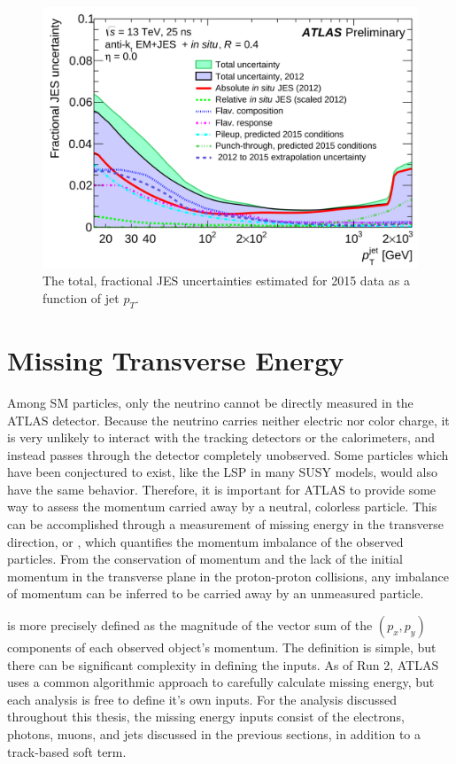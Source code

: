 \begin{figure}
\includegraphics[width=\fullfig]{figures/reco_jes_pt.png}
\caption{The total, fractional \ac{JES} uncertainties estimated for 2015 data as a function of jet $p_T$.}
\label{fig:reco_jesunc}
\end{figure}


\section{Missing Transverse Energy}
\label{sec:missing_energy}

Among \ac{SM} particles, only the neutrino cannot be directly measured in the \ac{ATLAS} detector. 
Because the neutrino carries neither electric nor color charge, it is very unlikely to interact with the tracking detectors or the calorimeters, and instead passes through the detector completely unobserved.
Some particles which have been conjectured to exist, like the \ac{LSP} in many \ac{SUSY} models, would also have the same behavior.
Therefore, it is important for \ac{ATLAS} to provide some way to assess the momentum carried away by a neutral, colorless particle.
This can be accomplished through a measurement of missing energy in the transverse direction, or \met, which quantifies the momentum imbalance of the observed particles.
From the conservation of momentum and the lack of the initial momentum in the transverse plane in the proton-proton collisions, any imbalance of momentum can be inferred to be carried away by an unmeasured particle.

\met is more precisely defined as the magnitude of the vector sum of the $(p_x,p_y)$ components of each observed object's momentum.
The definition is simple, but there can be significant complexity in defining the inputs.
As of Run 2, \ac{ATLAS} uses a common algorithmic approach to carefully calculate missing energy, but each analysis is free to define it's own inputs.
For the analysis discussed throughout this thesis, the missing energy inputs consist of the electrons, photons, muons, and jets discussed in the previous sections, in addition to a track-based soft term.

